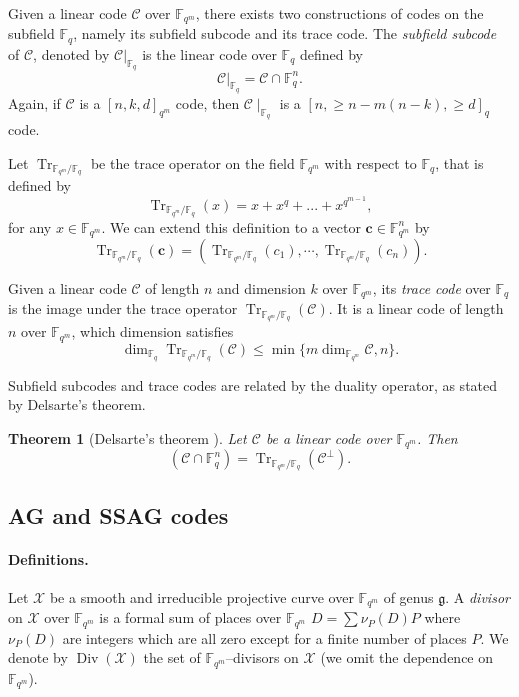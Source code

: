 \documentclass[a4paper]{article}
\newtheorem{thm}{Theorem}[section]
\theoremstyle{definition}
\theoremstyle{remark}
\newcommand{\calC}{\mathcal{C}}
\newcommand{\calX}{\mathcal{X}}
\newcommand{\fqm}{\mathbb{F}_{q^m}}
\newcommand{\fq}{\mathbb{F}_{q}}
\newcommand{\Tr}[1]{\operatorname{Tr}_{\mathbb{F}_{q^m}/\fq}\left(#1\right)}
\newcommand{\Div}{\operatorname{Div}}
\begin{document}
Given a linear code $\calC$ over $\fqm$, there exists two constructions of codes on the subfield $\fq$, namely its subfield subcode and its trace code. The \emph{subfield subcode} of $\calC$, denoted by $\calC|_{\fq}$ is the linear code over $\fq$ defined by 
\[\calC|_{\fq}=\calC \cap \mathbb{F}_q^n.\]
Again, if $\calC$ is a $[n,k,d]_{q^m}$ code, then $\calC\mid_{\fq}$ is a $[n,\geq n-m(n-k),\geq d]_q$ code.

Let $\operatorname{Tr}_{\mathbb{F}_{q^m}/\fq}$ be the trace operator on the field $\mathbb{F}_{q^m}$ with respect to $\mathbb{F}_q$, that is defined by
\[\Tr{x} = x + x^q + ... + x^{q^{m-1}},\]
for any $x \in \fqm$. We can extend this definition to a vector $\mathbf{c} \in \fqm^n$ by $$\Tr{\mathbf{c}}= (\Tr{c_1},\cdots,\Tr{c_n}).$$ 

\noindent Given a linear code $\calC$ of length $n$ and dimension $k$ over $\fqm$, its \emph{trace code} over $\fq$ is the image under the trace operator $\Tr{\calC}$. It is a linear code of length $n$ over $\fqm$, which dimension satisfies
\begin{equation}\label{eq:dim_trace}
\dim_{\mathbb{F}_q} \Tr{\calC} \leq \min\{m\dim_{\fqm} \calC,n\}.
\end{equation}

Subfield subcodes and trace codes are related by the duality operator, as stated by Delsarte's theorem.

\begin{thm}[Delsarte's theorem \cite{Del75}] \label{th:delsarte}
Let $\calC$ be a linear code over $\fqm$. Then
\[\left(\calC \cap \fq^n\right) = \Tr{\calC^{\perp}}.\]
\end{thm}

\subsection{AG and SSAG codes} \label{section:AG_codes}

\paragraph{Definitions.} Let $\calX$ be a smooth and irreducible projective curve over $\fqm$ of genus $\mathfrak{g}$. A \emph{divisor} on $\calX$ over $\fqm$ is a formal sum of places over $\fqm$ $D=\sum \nu_P(D) P$ where $\nu_P(D)$ are integers which are all zero except for a finite number of places $P$. We denote by $\Div(\calX)$ the set of $\fqm$--divisors on $\calX$ (we omit the dependence on $\fqm$).
\end{document}
